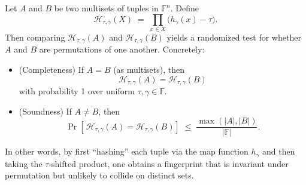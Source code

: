 \documentclass[../lecture-notes-148x210.tex]{subfiles}
\begin{document}
\begin{definition}
    Let $A$ and $B$ be two multisets of tuples in $\mathbb{F}^n$. Define
    \begin{equation*}
        \mathcal{H}_{\tau,\gamma}(X)\;=\;\prod_{x \in X}\bigl(h_{\gamma}(x)-\tau\bigr).
    \end{equation*}
    Then comparing $\mathcal{H}_{\tau,\gamma}(A)$ and $\mathcal{H}_{\tau,\gamma}(B)$ yields a
    randomized test for whether $A$ and $B$ are permutations of one another. Concretely:
    \begin{itemize}
        \item (Completeness) If $A=B$ (as multisets), then  
            \begin{equation*}
                \mathcal{H}_{\tau,\gamma}(A)=\mathcal{H}_{\tau,\gamma}(B)
            \end{equation*}
            with probability 1 over uniform $\tau,\gamma\in\mathbb{F}$.
        \item (Soundness) If $A\neq B$, then
            \begin{equation*}
                \Pr\left[\,\mathcal{H}_{\tau,\gamma}(A)=\mathcal{H}_{\tau,\gamma}(B)\right]\;\le\; \frac{\max(|A|,|B|)}{|\mathbb{F}|}.
            \end{equation*}
    \end{itemize}
\end{definition}

In other words, by first “hashing” each tuple via the map function $h_{\gamma}$ and then taking the 
$\tau$‐shifted product, one obtains a fingerprint that is invariant under permutation but unlikely 
to collide on distinct sets.
\end{document}
